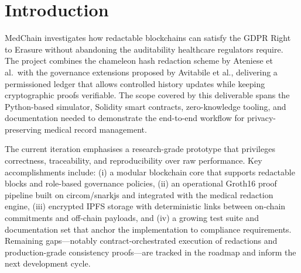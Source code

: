 \section{Introduction}

MedChain investigates how redactable blockchains can satisfy the GDPR Right to Erasure without abandoning the auditability healthcare regulators require. The project combines the chameleon hash redaction scheme by Ateniese et al.\ with the governance extensions proposed by Avitabile et al., delivering a permissioned ledger that allows controlled history updates while keeping cryptographic proofs verifiable. The scope covered by this deliverable spans the Python-based simulator, Solidity smart contracts, zero-knowledge tooling, and documentation needed to demonstrate the end-to-end workflow for privacy-preserving medical record management.

The current iteration emphasises a research-grade prototype that privileges correctness, traceability, and reproducibility over raw performance. Key accomplishments include: (i) a modular blockchain core that supports redactable blocks and role-based governance policies, (ii) an operational Groth16 proof pipeline built on circom/snarkjs and integrated with the medical redaction engine, (iii) encrypted IPFS storage with deterministic links between on-chain commitments and off-chain payloads, and (iv) a growing test suite and documentation set that anchor the implementation to compliance requirements. Remaining gaps---notably contract-orchestrated execution of redactions and production-grade consistency proofs---are tracked in the roadmap and inform the next development cycle.
